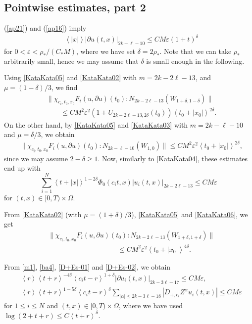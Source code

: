 \documentclass[12pt]{amsart}
\newcommand{\ve}{\varepsilon}
\newcommand{\pa}{\partial}
\newcommand{\jb}[1]{\left\langle #1 \right\rangle}
\numberwithin{equation}{section}
\begin{document}
\subsection{Pointwise estimates, part 2}
(\ref{ap21}) and (\ref{ap16}) imply
\begin{align}\label{KataKata05}
& \jb{|x|} |\partial u(t,x)|_{2k-\ell-10} 
\le  CM\ve (1+t)^{\delta}
\end{align}
for $0<\ve<\rho_*/(C_*M)$, where we have set $\delta=2\rho_*$.
Note that we can take $\rho_*$ arbitrarily small, hence we may assume that
$\delta$ is small enough in the following.

Using \eqref{KataKata05} and \eqref{KataKata02}
with $m=2k-2\ell-13$, and $\mu=(1-\delta)/3$,
we find
\begin{align*}
  &\|\chi_{c_i, t_0, x_0}F_i(u,\partial u)(t_0)\!:\! N_{2k-2\ell-13}
 (W_{1+\delta, 1-\delta})\|\\
   & \qquad \le 
 CM^2\ve^2(1+U_{2k-2\ell-13, 2\delta}(t_0))
\jb{t_0+|x_0|}^{2\delta}. %
\end{align*}
On the other hand, by \eqref{KataKata05} and \eqref{KataKata03} with $m=2k-\ell-10$
and $\mu=\delta/3$, we obtain
  \begin{align*}
   &\|\chi_{c_i, t_0, x_0}F_i(u,\partial u)(t_0)\!:\! N_{2k-\ell-10}(W_{1, 0})\|
 \le CM^2\ve^2 \jb{t_0+|x_0|}^{2\delta},
  \end{align*}
since we may assume $2-\delta\ge 1$.
Now, similarly to \eqref{KataKata04}, these estimates end up with
\begin{equation}
 \sum_{i=1}^N \jb{t+|x|}^{1-2\delta}\Phi_0(c_it, x)
 |u_i(t,x)|_{2k-2\ell-13}\le CM\ve 
\label{KataKata06}
\end{equation}
for $(t,x)\in [0, T)\times \Omega$.

From \eqref{KataKata02} (with $\mu=(1+\delta)/3$), \eqref{KataKata05} and \eqref{KataKata06},
we get
\begin{align}
&
\|\chi_{c_i, t_0, x_0}F_i(u,\partial u)(t_0)\!:\! N_{2k-2\ell-13}(W_{1+\delta, 1+\delta})\|
\\ 
\nonumber & \qquad\qquad\qquad\qquad\qquad
\le CM^2\ve^2 \jb{t_0+|x_0|}^{4\delta}.
\end{align}

From \eqref{m1}, \eqref{ba4}, \eqref{D+Es-01} and \eqref{D+Es-02},
we obtain
\begin{align}
& \jb{r}\jb{t+r}^{-4\delta}\jb{c_it-r}^{1+\delta}
|\pa u_i(t,x)|_{2k-3\ell-17}\le CM\ve,
\label{KataKata07}\\
& \jb{r}\jb{t+r}^{1-5\delta}\jb{c_it-r}^\delta
\sum_{|\alpha|\le 2k-3\ell-18}|D_{+, c_i} Z^\alpha u_i(t,x)|%
\le CM\ve
\label{KataKata08}
\end{align}
for $1\le i\le N$ and $(t,x)\in [0,T)\times \Omega$,
where we have used $\log(2+t+r)\le C\jb{t+r}^{\delta}$.
\end{document}
